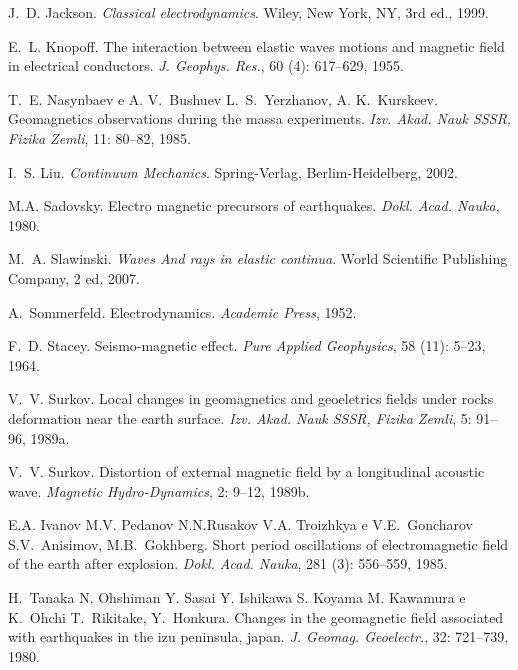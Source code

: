 \documentclass[12pt,a4paper,oneside]{abntex2}
\begin{document}
\begin{thebibliography}{25}
J.~D. Jackson.
\newblock \emph{Classical electrodynamics}.
\newblock Wiley, New York, {NY}, 3rd ed., 1999.


E.~L. Knopoff.
\newblock The interaction between elastic waves motions and magnetic field in
  electrical conductors.
\newblock \emph{J. Geophys. Res.}, 60 (4): 617--629, 1955.

T.~E. Nasynbaev e A. V.~Bushuev L.~S.~Yerzhanov, A. K.~Kurskeev.
\newblock Geomagnetics observations during the massa experiments.
\newblock \emph{Izv. Akad. Nauk SSSR, Fizika Zemli}, 11: 80--82, 1985.

I.~S. Liu.
\newblock \emph{Continuum Mechanics}.
\newblock Spring-Verlag, Berlim-Heidelberg, 2002.

M.A. Sadovsky.
\newblock Electro magnetic precursors of earthquakes.
\newblock \emph{Dokl. Acad. Nauka}, 1980.

M.~A. Slawinski.
\newblock \emph{Waves And rays in elastic continua}.
\newblock World Scientific Publishing Company, 2 ed, 2007.


A.~Sommerfeld.
\newblock Electrodynamics.
\newblock \emph{Academic Press}, 1952.

F.~D. Stacey.
\newblock Seismo-magnetic effect.
\newblock \emph{Pure Applied Geophysics}, 58 (11): 5--23,
  1964.

V.~V. Surkov.
\newblock Local changes in geomagnetics and geoeletrics fields under rocks
  deformation near the earth surface.
\newblock \emph{Izv. Akad. Nauk SSSR, Fizika Zemli}, 5: 91--96, 1989a.

V.~V. Surkov.
\newblock Distortion of external magnetic field by a longitudinal acoustic
  wave.
\newblock \emph{Magnetic Hydro-Dynamics}, 2: 9--12, 1989b.

E.A. Ivanov M.V. Pedanov N.N.Rusakov V.A. Troizhkya e V.E.~Goncharov
  S.V.~Anisimov, M.B.~Gokhberg.
\newblock Short period oscillations of electromagnetic field of the earth after
  explosion.
\newblock \emph{Dokl. Acad. Nauka}, 281 (3): 556--559, 1985.

H.~Tanaka N. Ohshiman Y. Sasai Y. Ishikawa S. Koyama M. Kawamura e K.~Ohchi
  T.~Rikitake, Y.~Honkura.
\newblock Changes in the geomagnetic field associated with earthquakes in the
  izu peninsula, japan.
\newblock \emph{J. Geomag. Geoelectr.}, 32: 721--739, 1980.



\end{thebibliography}
\end{document}
